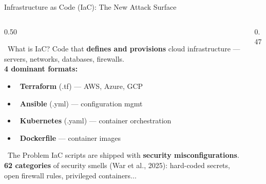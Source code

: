 \documentclass[aspectratio=169, 10pt]{beamer}
\begin{document}
{
\begin{frame}[plain]
\end{frame}
}

\begin{frame}[shrink=12]{Infrastructure as Code (IaC): The New Attack Surface}
  \begin{columns}[T]
    \begin{column}{0.50\textwidth}
      \begin{block}{\faCode\ What is IaC?}
        Code that \textbf{defines and provisions} cloud infrastructure ---
        servers, networks, databases, firewalls.\\[0.1em]
        \textbf{4 dominant formats:}
        \begin{itemize}
          \item \faCloud\ \textbf{Terraform} (.tf) --- AWS, Azure, GCP
          \item \faServer\ \textbf{Ansible} (.yml) --- configuration mgmt
          \item \faDocker\ \textbf{Kubernetes} (.yaml) --- container orchestration
          \item \faDocker\ \textbf{Dockerfile} --- container images
        \end{itemize}
      \end{block}
      \vspace{0.2em}
      \begin{alertblock}{\faExclamationTriangle\ The Problem}
        IaC scripts are shipped with \textbf{security misconfigurations}.\\
        \textbf{62 categories} of security smells (War et al., 2025):
        hard-coded secrets, open firewall rules, privileged containers...
      \end{alertblock}
    \end{column}
    \begin{column}{0.47\textwidth}
      \begin{center}

\end{center}
\end{column}
\end{columns}
\end{frame}
\end{document}
